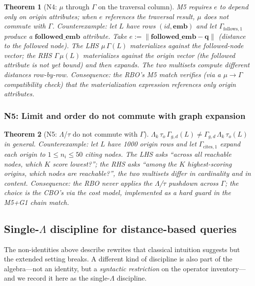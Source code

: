 \documentclass[sigconf]{acmart}
\theoremstyle{plain}
\newtheorem{theorem}{Theorem}
\theoremstyle{definition}
\newcommand{\vect}[1]{\boldsymbol{#1}}
\theoremstyle{remark}
\begin{document}
\begin{theorem}[N4: $\mu$ through $\Gamma$ on the traversal column]\label{thm:n4}
M5 requires $e$ to depend only on \emph{origin} attributes;
when $e$ references the traversal result, $\mu$ does not commute
with $\Gamma$. \emph{Counterexample:} let $L$ have rows
$(\mathit{id}, \vect{emb})$ and let
$\Gamma_{\mathrm{follows},1}$ produce a $\vect{followed\_emb}$
attribute. Take $e:= \lVert \vect{followed\_emb} - \vect{q} \rVert$
(distance to the followed node). The LHS $\mu\,\Gamma(L)$
materializes against the followed-node vector; the RHS
$\Gamma\,\mu(L)$ materializes against the origin vector (the
followed attribute is not yet bound) and then expands. The two
multisets compute different distances row-by-row.
\emph{Consequence:} the RBO's M5 match verifies (via a $\mu \to
\Gamma$ compatibility check) that the materialization expression
references only origin attributes.
\end{theorem}

\subsubsection{N5: Limit and order do not commute with graph expansion}

\begin{theorem}[N5: $\Lambda$/$\tau$ do not commute with $\Gamma$]\label{thm:n5}
$\Lambda_k\, \tau_o\, \Gamma_{g, d}(L) \neq
\Gamma_{g, d}\, \Lambda_k\, \tau_o(L)$ in general.
\emph{Counterexample:} let $L$ have 1000 origin rows and let
$\Gamma_{\mathrm{cites},1}$ expand each origin to $1 \leq n_i
\leq 50$ citing nodes. The LHS asks ``across all reachable
nodes, which $K$ score lowest?''; the RHS asks ``among the $K$
highest-scoring origins, which nodes are reachable?'', the two
multisets differ in cardinality and in content.
\emph{Consequence:} the RBO never applies the $\Lambda$/$\tau$
pushdown across $\Gamma$; the choice is the CBO's via the cost
model, implemented as a hard guard in the M5+G1 chain match.
\end{theorem}

\subsection{Single-$\Lambda$ discipline for distance-based queries}
\label{sec:equational:single-lambda}

The non-identities above describe rewrites that classical intuition
suggests but the extended setting breaks. A different kind of
discipline is also part of the algebra---not an identity, but a
\emph{syntactic restriction} on the operator inventory---and we
record it here as the single-$\Lambda$ discipline.
\end{document}
